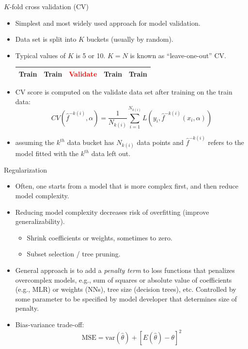\documentclass{beamer}
\begin{document}
\begin{frame}{$K$-fold cross validation (CV)}
    \begin{itemize}
        \item Simplest and most widely used approach for model validation.
        \item Data set is split into $K$ buckets (usually by random).
        \item Typical values of $K$ is 5 or 10. $K = N$ is known as ``leave-one-out'' CV.
        \begin{table}
        \begin{tabular}{|p{1.7cm}|p{1.7cm}|p{1.7cm}|p{1.7cm}|p{1.7cm}|}
            \hline
            \Large{Train} & \Large{Train} & \textcolor{red}{\Large{Validate}} & \Large{Train} & \Large{Train}\\
            \hline
        \end{tabular}
        \end{table}
        \item CV score is computed on the validate data set after training on the train data:
        \begin{equation*}
                CV(\hat{f}^{-k(i)},\alpha) = \frac{1}{N_{k(i)}}\sum_{i=1}^{N_{k(i)}} L(y_i, \hat{f}^{-k(i)}(x_i,\alpha))
        \end{equation*}
        \item assuming the $k^{th}$ data bucket has $N_{k(i)}$ data points and $\hat{f}^{-k(i)}$ refers to the model fitted with the $k^{th}$ data left out.
    \end{itemize}
\end{frame}


\begin{frame}{Regularization}
    \begin{itemize}
        \item Often, one starts from a model that is more complex first, and then reduce model complexity.
        \item Reducing model complexity decreases risk of overfitting (improve generalizability).
        \begin{itemize}
            \item Shrink coefficients or weights, sometimes to zero.
            \item Subset selection / tree pruning.
        \end{itemize}
        \item General approach is to add a \textit{penalty term} to loss functions that penalizes overcomplex models, e.g., sum of squares or absolute value of coefficients (e.g., MLR) or weights (NNs), tree size (decision trees), etc. Controlled by some parameter to be specified by model developer that determines size of penalty.
        \item Bias-variance trade-off:
        \begin{equation*}
            \mathrm{MSE} = \mathrm{var}(\hat{\theta}) + [E(\hat{\theta}) - \theta]^2
        \end{equation*}
    \end{itemize}
\end{frame}
\end{document}
